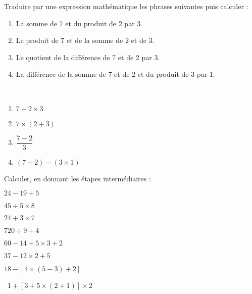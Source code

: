 \begin{colonne*exercice}
\medskip

\begin{exercice}%
   Traduire par une expression mathématique les phrases suivantes puis calculer :
   \begin{enumerate}
      \item La somme de 7 et du produit de 2 par 3.
      \item Le produit de 7 et de la somme de 2 et de 3.
      \item Le quotient de la différence de 7 et de 2 par 3.
      \item La différence de la somme de 7 et de 2 et du produit de 3 par 1.
   \end{enumerate}
\end{exercice}

\begin{corrige}
   \ \\ [-5mm]
   \begin{enumerate}
      \item \blue $7+2\times3$
      \item \blue $7\times(2+3)$ \smallskip
      \item \blue $\dfrac{7-2}{3}$ \medskip
      \item \blue $(7+2)-(3\times1)$
   \end{enumerate}
\end{corrige}

\bigskip


\begin{exercice} %
  Calculer, en donnant les étapes intermédiaires :
   \begin{colenumerate}{2}
      \item $24-19+5$
      \item $45\div5\times8$
      \item $24+3\times7$
      \item $720\div9+4$
      \item $60-14+5\times3+2$
      \item $37-12\times2+5$
      \item $18-[4\times(5-3)+2]$
      \item \, $1+[3+5\times(2+1)]\times2$
\end{colenumerate}
\end{exercice}


\end{colonne*exercice}
